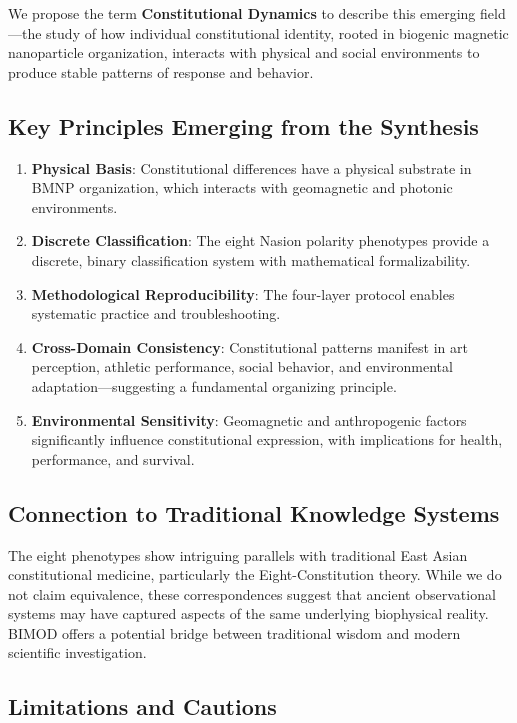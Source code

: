 \documentclass[12pt,a4paper]{article}
\begin{document}
We propose the term \textbf{Constitutional Dynamics} to describe this emerging field—the study of how individual constitutional identity, rooted in biogenic magnetic nanoparticle organization, interacts with physical and social environments to produce stable patterns of response and behavior.

\subsection{Key Principles Emerging from the Synthesis}

\begin{enumerate}
    \item \textbf{Physical Basis}: Constitutional differences have a physical substrate in BMNP organization, which interacts with geomagnetic and photonic environments.
    \item \textbf{Discrete Classification}: The eight Nasion polarity phenotypes provide a discrete, binary classification system with mathematical formalizability.
    \item \textbf{Methodological Reproducibility}: The four-layer protocol enables systematic practice and troubleshooting.
    \item \textbf{Cross-Domain Consistency}: Constitutional patterns manifest in art perception, athletic performance, social behavior, and environmental adaptation—suggesting a fundamental organizing principle.
    \item \textbf{Environmental Sensitivity}: Geomagnetic and anthropogenic factors significantly influence constitutional expression, with implications for health, performance, and survival.
\end{enumerate}

\subsection{Connection to Traditional Knowledge Systems}

The eight phenotypes show intriguing parallels with traditional East Asian constitutional medicine, particularly the Eight-Constitution theory. While we do not claim equivalence, these correspondences suggest that ancient observational systems may have captured aspects of the same underlying biophysical reality. BIMOD offers a potential bridge between traditional wisdom and modern scientific investigation.

\subsection{Limitations and Cautions}
\end{document}
